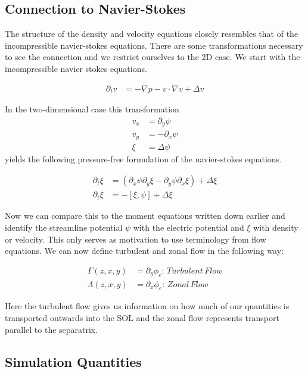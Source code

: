 \documentclass[master.tex]{subfiles}
\begin{document}
\subsection{Connection to Navier-Stokes}
\label{sec:connection_navier_stokes}

The structure of the density and velocity equations closely resembles that of the incompressible navier-stokes equations.
There are some transformations necessary to see the connection and we restrict ourselves to the 2D case. We start with the incompressible navier stokes equations.

\begin{align}
    \partial_t v &= - \nabla p - v \cdot \nabla v + \Delta v
\end{align}

In the two-dimensional case this transformation
\begin{align}
    v_x &= \partial_y \psi \\
    v_y &= -\partial_x \psi \\
    \xi &= \Delta \psi
\end{align}
yields the following pressure-free formulation of the navier-stokes equations.

\begin{align}
    \partial_t \xi &= \left( \partial_x \psi \partial_y \xi - \partial_y \psi \partial_x \xi  \right) + \Delta \xi\\
    \partial_t \xi &= - \left[\xi, \psi\right] + \Delta \xi
\end{align}

Now we can compare this to the moment equations written down earlier and identify the streamline potential $\psi$ with the electric potential and $\xi$ with density or velocity. This only serves as motivation to use terminology from flow equations. We can now define turbulent and zonal flow in the following way:

\begin{align}
    \Gamma(z,x,y) &= \partial_y \phi_e :\, Turbulent\,Flow\\
    \Lambda(z,x,y) &= \partial_x \phi_e :\, Zonal\,Flow
\end{align}

Here the turbulent flow gives us information on how much of our quantities is transported outwards into the SOL and the zonal flow represents transport parallel to the separatrix.

\subsection{Simulation Quantities}\label{sec:simulation_quantities}
\end{document}
